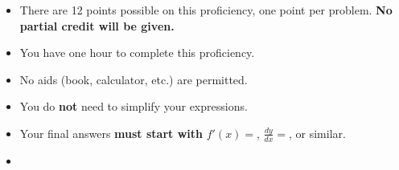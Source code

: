 \documentclass[12pt]{article}
\begin{document}
\begin{itemize}
\addtolength\itemsep{-1mm}
\item There are 12 points possible on this proficiency, one point per problem. {\bf No partial credit will be given.}

\item You have one hour to complete this proficiency.

\item No aids (book, calculator, etc.) are permitted.  

\item You do \textbf{not} need to simplify your expressions.



\item Your final answers \textbf{must start with} $f'(x)=$, $\frac{dy}{dx}=$, or similar.

\item {\bf {}}
\end{itemize}
\end{document}
